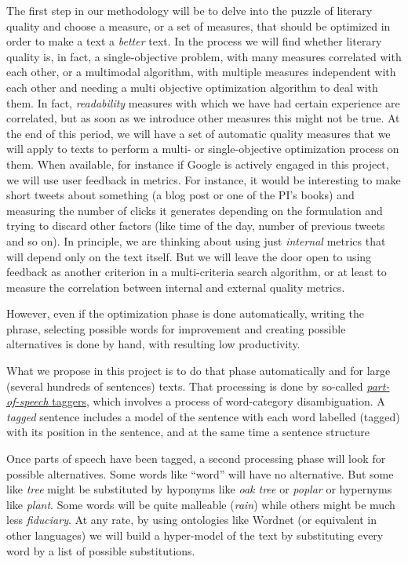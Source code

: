 \documentclass[a4paper,12pt,twocolumn]{article}
\begin{document}
The first step in our methodology will be to delve into the puzzle
of literary quality and choose a measure, or a set of measures, that
should be optimized in order to make a text a {\em better} text. In
the process we will find whether literary quality is, in fact, a
single-objective problem, with many measures correlated with each
other, or a multimodal algorithm, with multiple measures independent
with each other and needing a multi objective optimization algorithm to
deal with them. In fact, {\em readability} measures with which we have
had certain experience are correlated, but as soon as we introduce
other measures this might not be true. At the end of this period, we
will have a set of automatic quality measures that we will apply to
texts to perform a multi- or single-objective optimization process on
them. When available, for instance if Google is actively engaged in this
project, we will use user feedback in metrics. For instance, it would
be interesting to make short tweets about something (a blog post or
one of the PI's books) and measuring the number of clicks it generates
depending on the formulation and trying to discard other factors (like
time of the day, number of previous tweets and so on). In principle,
we are thinking about using just {\em internal} metrics that will
depend only on the text itself. But we will leave the door open to
using feedback as another criterion in a multi-criteria search
algorithm, or at least to measure the correlation between internal and
external quality metrics. 

However, even if the optimization phase is done automatically, writing
the phrase, selecting possible words for improvement and creating
possible alternatives is done by hand, with resulting low
productivity. 

What we propose in this project is to do that phase automatically and
for large (several hundreds of sentences) texts. That processing is
done by so-called \href{http://en.wikipedia.org/wiki/Part-of-speech_tagging}{{\em part-of-speech} taggers}, which involves a
process of word-category disambiguation. A {\em tagged} sentence
includes a model of the sentence with each word labelled (tagged) with
its position in the sentence, and at the same time a sentence
structure 

Once parts of speech have been tagged, a second processing phase will
look for possible alternatives. Some words like ``word'' will have no
alternative. But some like {\em tree} might be substituted by hyponyms
like {\em oak tree} or {\em poplar} or hypernyms like {\em plant}.
Some words will be quite malleable ({\em rain}) while others might be
much less {\em fiduciary}. At any rate, by using ontologies like
Wordnet (or equivalent in other languages) we will build a hyper-model
of the text by substituting every word by a list of possible
substitutions.
\end{document}
